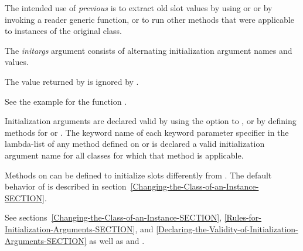 \begin{defun}
The intended use of \emph{previous\/} is to extract old slot values by using
 or  or by invoking a reader generic
function, or to run other methods that were applicable to instances of
the original class.

The \emph{initargs\/} argument consists of alternating initialization
argument names and values.


The value returned by  is
ignored by .

See the example for the function .


Initialization arguments are declared valid by using the 
 option to , or by defining methods for 
 or .  The
keyword name of each keyword parameter specifier in the lambda-list of
any method defined on  or 
 is declared a valid initialization argument name
for all classes for which that method is applicable.

Methods on  can be defined to
initialize slots differently from .  The default
behavior of  is described in
section~\ref{Changing-the-Class-of-an-Instance-SECTION}.


See sections~\ref{Changing-the-Class-of-an-Instance-SECTION},
\ref{Rules-for-Initialization-Arguments-SECTION}, and
\ref{Declaring-the-Validity-of-Initialization-Arguments-SECTION} as well as
 and .
\end{defun}


